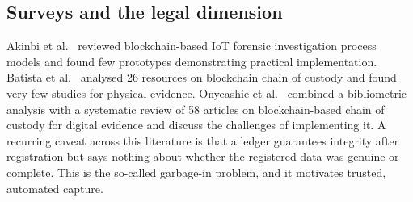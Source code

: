 \documentclass[conference,a4paper,10pt]{IEEEtran}
\begin{document}
\subsection{Surveys and the legal dimension}
Akinbi et al.\ \cite{akinbi} reviewed blockchain-based IoT forensic investigation process models and found few prototypes demonstrating practical implementation. Batista et al.\ \cite{batista} analysed 26 resources on blockchain chain of custody and found very few studies for physical evidence. Onyeashie et al.\ \cite{onyeashie} combined a bibliometric analysis with a systematic review of 58 articles on blockchain-based chain of custody for digital evidence and discuss the challenges of implementing it. A recurring caveat across this literature is that a ledger guarantees integrity after registration but says nothing about whether the registered data was genuine or complete. This is the so-called garbage-in problem, and it motivates trusted, automated capture.
\end{document}
